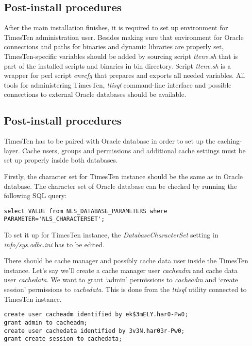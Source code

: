 \documentclass[11pt, letterpaper]{article}
\begin{document}
\subsection{Post-install procedures}

After the main installation finishes, it is required to set up environment for TimesTen administration user. Besides making sure that environment for Oracle connections and paths for binaries and dynamic libraries are properly set, TimesTen-specific variables should be added by sourcing script \emph{ttenv.sh} that is part of the installed scripts and binaries in bin directory. Script \emph{ttenv.sh} is a wrapper for perl script \emph{envcfg} that prepares and exports all needed variables. All tools for administering TimesTen, \emph{ttisql} command-line interface and possible connections to external Oracle databases should be available.

\subsection{Post-install procedures}

TimesTen has to be paired with Oracle database in order to set up the caching-layer. Cache users, groups and permissions  and additional cache settings must be set up properly inside both databases.

Firstly, the character set for TimesTen instance should be the same as in Oracle database. The character set of Oracle database can be checked by running the following SQL query:

\begin{lstlisting}
select VALUE from NLS_DATABASE_PARAMETERS where PARAMETER='NLS_CHARACTERSET';
\end{lstlisting}

To set it up for TimesTen instance, the \emph{DatabaseCharacterSet} setting in \emph{info/sys.odbc.ini} has to be edited.

There should be cache manager and possibly cache data user inside the TimesTen instance. Let’s say we’ll create a cache manager user \emph{cacheadm} and cache data user \emph{cachedata}. We want to grant ‘admin’ permissions to \emph{cacheadm} and ‘create session’ permissions to \emph{cachedata}. This is done from the \emph{ttisql} utility connected to TimesTen instance.

\begin{lstlisting}
create user cacheadm identified by ek$3mELY.har0-Pw0; 
grant admin to cacheadm;
create user cachedata identified by 3v3N.har03r-Pw0; 
grant create session to cachedata;
\end{lstlisting}
\end{document}
